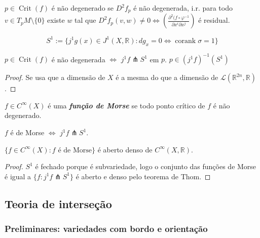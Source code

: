 \begin{defn}\leavevmode
\(p \in \operatorname{Crit}(f)\) é não degenerado se \(D^2f_p\) é não degenerada, i.r. para todo \(v \in T_pM \setminus\{0\}\) existe \(w\) tal que \(D^2f_p(v,w)\neq 0 \iff \left(\frac{\partial^2(f \circ \varphi^{-1}}{\partial x^i \partial x^j}\right) \) é residual.
\end{defn}

\[S^1:= \{ j^1 g(x) \in J^1(X,\mathbb{R}):dg_x=0 \iff \operatorname{corank}\sigma=1\}\]

\begin{prop}\leavevmode
\(p \in \operatorname{Crit}(f)\) é não degenerada \(\iff\) \(j^1f \pitchfork S^1\) em $p$. \(p \in (j^1f)^{-1}(S^1)\)
\end{prop}

\begin{proof}\leavevmode
Se usa que a dimensão de \(X\) é a mesma do que a dimensão de \(\mathcal{L}(\mathbb{R}^{2n},\mathbb{R})\).
\end{proof}

\begin{defn}\leavevmode
\(f \in C^\infty(X)\) é uma \textit{\textbf{função de Morse}} se todo ponto crítico de $f$ é não  degenerado.
\end{defn}

\begin{coro}[da proposição]\leavevmode
$f$ é de Morse \(\iff\) \(j^1 f \pitchfork S^1\).
\end{coro}

\begin{thm}\leavevmode
\(\{f \in C^\infty(X): f \text{ é de Morse} \}\) é aberto denso de \(C^\infty(X,\mathbb{R})\).
\end{thm}

\begin{proof}\leavevmode
\(S^1\) é fechado porque é subvariedade, logo o conjunto das funções de Morse é igual a \(\{f : j^1 f \pitchfork S^1\}\) é aberto e denso pelo teorema de Thom.
\end{proof}

\subsection{Teoria de interseção}

\subsubsection{Preliminares: variedades com bordo e orientação}

